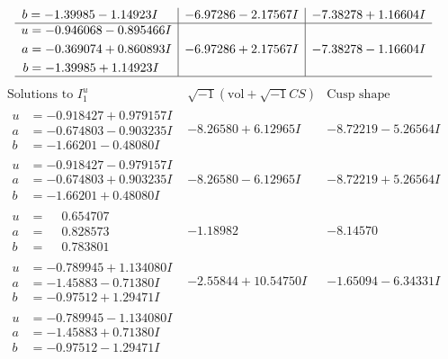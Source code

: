 \documentclass[1p]{elsarticle_modified}
\theoremstyle{definition}
\newcommand{\I}{\sqrt{-1}}
\begin{document}
$$\begin{array}{c|c|c}
\begin{aligned}
b &= -1.39985 - 1.14923 I\end{aligned}
 & -6.97286 - 2.17567 I & -7.38278 + 1.16604 I \\ \hline\begin{aligned}
u &= -0.946068 - 0.895466 I \\
a &= -0.369074 + 0.860893 I \\
b &= -1.39985 + 1.14923 I\end{aligned}
 & -6.97286 + 2.17567 I & -7.38278 - 1.16604 I\\
 \hline 
 \end{array}$$\newpage$$\begin{array}{c|c|c}  
\text{Solutions to }I^u_{1}& \I (\text{vol} + \sqrt{-1}CS) & \text{Cusp shape}\\
 \hline 
\begin{aligned}
u &= -0.918427 + 0.979157 I \\
a &= -0.674803 - 0.903235 I \\
b &= -1.66201 - 0.48080 I\end{aligned}
 & -8.26580 + 6.12965 I & -8.72219 - 5.26564 I \\ \hline\begin{aligned}
u &= -0.918427 - 0.979157 I \\
a &= -0.674803 + 0.903235 I \\
b &= -1.66201 + 0.48080 I\end{aligned}
 & -8.26580 - 6.12965 I & -8.72219 + 5.26564 I \\ \hline\begin{aligned}
u &= \phantom{-}0.654707\phantom{ +0.000000I} \\
a &= \phantom{-}0.828573\phantom{ +0.000000I} \\
b &= \phantom{-}0.783801\phantom{ +0.000000I}\end{aligned}
 & -1.18982\phantom{ +0.000000I} & -8.14570\phantom{ +0.000000I} \\ \hline\begin{aligned}
u &= -0.789945 + 1.134080 I \\
a &= -1.45883 - 0.71380 I \\
b &= -0.97512 + 1.29471 I\end{aligned}
 & -2.55844 + 10.54750 I & -1.65094 - 6.34331 I \\ \hline\begin{aligned}
u &= -0.789945 - 1.134080 I \\
a &= -1.45883 + 0.71380 I \\
b &= -0.97512 - 1.29471 I\end{aligned}

\end{array}$$
\end{document}
